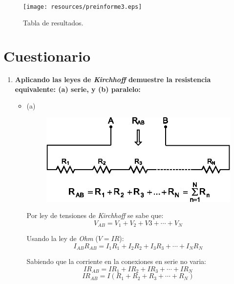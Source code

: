 \documentclass[letter,11pt]{article}
\begin{document}
\begin{figure}[!h]
\centering
\texttt{[image: resources/preinforme3.eps]}
\caption{Tabla de resultados.}
\label{tablas}
\end{figure}

\newpage

\section{Cuestionario}

\begin{enumerate}

\item \textbf{Aplicando las leyes de \emph{Kirchhoff} demuestre la resistencia
equivalente: (a) serie, y (b) paralelo:} \\

\begin{itemize}
    \item (a)
        \begin{figure}[!h]
        \centering
        \includegraphics[scale=1.00]{resources/figura3a.eps}
        \end{figure}

        Por ley de tensiones de \emph{Kirchhoff} se sabe que:
        \begin{equation*}
            V_{AB}=V_1+V_2+V3+\cdots+V_N
        \end{equation*}

        Usando la ley de \emph{Ohm} ($V=IR$):
        \begin{equation*}
            I_{AB}R_{AB}=I_1 R_1+I_2 R_2+I_3 R_3+\cdots+I_N R_N
        \end{equation*}

        Sabiendo que la corriente en la conexiones en serie no varia:
        \begin{equation*}
            IR_{AB}=IR_1+IR_2+IR_3+\cdots+IR_N
        \end{equation*}
        \begin{equation*}
            IR_{AB}=I(R_1+R_2+R_3+\cdots+R_N)
        \end{equation*}


\end{itemize}
\end{enumerate}
\end{document}
